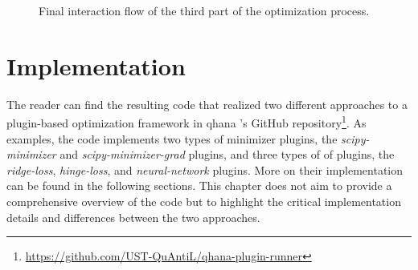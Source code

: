 \documentclass[
  a4paper,  %
  twoside,  %
  bibliography=totoc,
  headsepline,
  cleardoublepage=empty,
  parskip=half,
  draft=false
]{scrbook}
\begin{document}
\begin{figure}[p]
  \centering
  \checkoddpage
  \ifoddpage
  \else
  \fi
  \caption{Final interaction flow of the third part of the optimization process.}
  \label{fig:interaction_flow_part3}
\end{figure}




\chapter{Implementation}
\label{chap:implementation}

The reader can find the resulting code that realized two different approaches to a plugin-based optimization framework in \gls{qhana} 's GitHub repository\footnote{\url{https://github.com/UST-QuAntiL/qhana-plugin-runner}}.
As examples, the code implements two types of minimizer plugins, the \emph{scipy-minimizer} and \emph{scipy-minimizer-grad} plugins, and three types of \gls{of} plugins, the \emph{ridge-loss}, \emph{hinge-loss}, and \emph{neural-network} plugins.
More on their implementation can be found in the following sections.
This chapter does not aim to provide a comprehensive overview of the code but to highlight the critical implementation details and differences between the two approaches.
\end{document}
